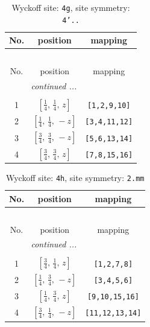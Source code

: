 \documentclass[fleqn,8pt]{jsarticle}
\begin{document}
\renewcommand{\arraystretch}{1.2}
\begin{longtable}{ccc}
\caption{Wyckoff site: {\tt 4g}, site symmetry: {\tt 4'..}}
 \\
 \hline \hline
No. & position & mapping \\ \hline \endfirsthead

\multicolumn{2}{l}{\tablename\ \thetable{}} \\
 \hline \hline
No. & position & mapping \\ \hline \endhead

 \hline \hline
\multicolumn{2}{r}{\footnotesize\it continued ...} \\ \endfoot

 \hline \hline
\multicolumn{2}{r}{} \\ \endlastfoot

1 & $\left[ \frac{1}{4},\, \frac{1}{4},\, z \right]$ & {\tt [1,2,9,10]} \\ \hline
2 & $\left[ \frac{1}{4},\, \frac{1}{4},\, - z \right]$ & {\tt [3,4,11,12]} \\ \hline
3 & $\left[ \frac{3}{4},\, \frac{3}{4},\, - z \right]$ & {\tt [5,6,13,14]} \\ \hline
4 & $\left[ \frac{3}{4},\, \frac{3}{4},\, z \right]$ & {\tt [7,8,15,16]} \\
\end{longtable}
\renewcommand{\arraystretch}{1.2}
\begin{longtable}{ccc}
\caption{Wyckoff site: {\tt 4h}, site symmetry: {\tt 2.mm}}
 \\
 \hline \hline
No. & position & mapping \\ \hline \endfirsthead

\multicolumn{2}{l}{\tablename\ \thetable{}} \\
 \hline \hline
No. & position & mapping \\ \hline \endhead

 \hline \hline
\multicolumn{2}{r}{\footnotesize\it continued ...} \\ \endfoot

 \hline \hline
\multicolumn{2}{r}{} \\ \endlastfoot

1 & $\left[ \frac{3}{4},\, \frac{1}{4},\, z \right]$ & {\tt [1,2,7,8]} \\ \hline
2 & $\left[ \frac{1}{4},\, \frac{3}{4},\, - z \right]$ & {\tt [3,4,5,6]} \\ \hline
3 & $\left[ \frac{1}{4},\, \frac{3}{4},\, z \right]$ & {\tt [9,10,15,16]} \\ \hline
4 & $\left[ \frac{3}{4},\, \frac{1}{4},\, - z \right]$ & {\tt [11,12,13,14]} \\
\end{longtable}
\end{document}
